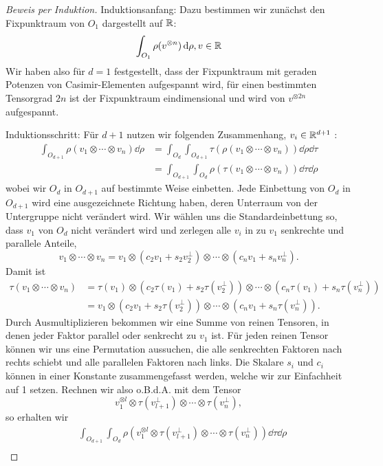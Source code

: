 \begin{proof}[Beweis per Induktion]
Induktionsanfang:
Dazu bestimmen wir zunächst den Fixpunktraum von $O_1$ dargestellt auf $\mathbb{R}$:
\[
\int_{O_1} \rho (v^{\otimes n}) \,\textrm{d} \rho, v\in\mathbb{R}
\]
Wir haben also für $d=1$ festgestellt, dass der Fixpunktraum mit geraden Potenzen von Casimir-Elementen aufgespannt wird, für einen bestimmten Tensorgrad $2n$ ist der Fixpunktraum eindimensional und wird von $v^{\otimes 2n}$ aufgespannt.

Induktionsschritt: 
Für $d+1$ nutzen wir folgenden Zusammenhang, $ v_i\in\mathbb{R}^{d+1}$ :
\begin{align*}
\int_{O_{d+1}} \rho (v_1\otimes\cdots \otimes v_n) \dd \rho &= \int_{O_{d}} \int_{O_{d+1}} \tau(\rho (v_1\otimes\cdots \otimes v_n)) \dd \rho \dd \tau \\
&=  \int_{O_{d+1}} \int_{O_{d}} \rho(\tau (v_1\otimes\cdots \otimes v_n)) \dd \tau \dd \rho
\end{align*}
wobei wir $O_d$ in $O_{d+1}$ auf bestimmte Weise einbetten. 
Jede Einbettung von $O_d$ in $O_{d+1}$ wird eine ausgezeichnete Richtung haben, deren Unterraum von der Untergruppe nicht verändert wird. Wir wählen uns die Standardeinbettung so, dass $v_1$ von $O_d$ nicht verändert wird und zerlegen alle $v_i$ in zu $v_1$ senkrechte und parallele Anteile,
\[
v_1\otimes\cdots \otimes v_n = v_1 \otimes (c_2 v_1 + s_2 v_2^\perp)\otimes \cdots \otimes (c_n v_1 + s_n v_n^\perp) .
\]
Damit ist
\begin{align*}
\tau(v_1\otimes\cdots \otimes v_n) &= \tau(v_1) \otimes (c_2 \tau(v_1) + s_2 \tau( v_2^\perp))\otimes \cdots \otimes (c_n \tau(v_1) + s_n \tau(v_n^\perp)) \\
&= v_1 \otimes (c_2 v_1 + s_2 \tau(v_2^\perp))\otimes \cdots \otimes (c_n v_1 + s_n \tau(v_n^\perp)) .
\end{align*}
Durch Ausmultiplizieren bekommen wir eine Summe von reinen Tensoren, in denen jeder Faktor parallel oder senkrecht zu $v_1$ ist. Für jeden reinen Tensor können wir uns eine Permutation aussuchen, die alle senkrechten Faktoren nach rechts schiebt und alle parallelen Faktoren nach links. Die Skalare $s_i$ und $c_i$ können in einer Konstante zusammengefasst werden, welche wir zur Einfachheit auf 1 setzen. Rechnen wir also o.B.d.A. mit dem Tensor
\[
 v_1^{\otimes l} \otimes \tau(v_{l+1}^\perp) \otimes \cdots \otimes \tau(v_n^\perp),
\] 
so erhalten wir
\begin{align*}
	&\int_{O_{d+1}} \int_{O_{d}} \rho\left(v_1^{\otimes l} \otimes \tau(v_{l+1}^\perp) \otimes \cdots \otimes \tau(v_n^\perp)\right) \dd \tau \dd \rho \\

\end{align*}
\end{proof}
